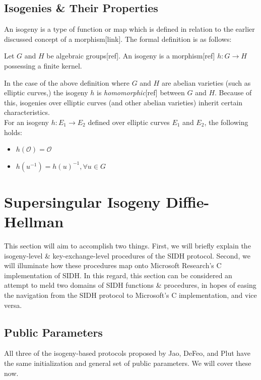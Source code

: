 \subsection{Isogenies \& Their Properties}

An isogeny is a type of function or map which is defined in relation to the earlier discussed concept of a morphism[link]. The formal definition is as follows:\\
\begin{definition}[Isogeny]
\label{defn:isogeny}
Let $G$ and $H$ be algebraic groups[ref]. An isogeny is a morphism[ref] $h: G \rightarrow H$ possessing a finite kernel.
\end{definition}
In the case of the above definition where $G$ and $H$ are abelian varieties (such as elliptic curves,) the isogeny $h$ is \emph{homomorphic}[ref] between $G$ and $H$. Because of this, isogenies over elliptic curves (and other abelian varieties) inherit certain characteristics.\\
For an isogeny $h: E_{1} \rightarrow E_{2}$ defined over elliptic curves $E_1$ and $E_2$, the following holds:
\begin{itemize}
\item $h(\mathcal{O}) = \mathcal{O}$
\item $h(u^{-1}) = h(u)^{-1}, \forall u \in G$
\end{itemize}

\section{Supersingular Isogeny Diffie-Hellman}

This section will aim to accomplish two things. First, we will briefly explain the isogeny-level \& key-exchange-level procedures of the SIDH protocol. Second, we will illuminate how these procedures map onto Microsoft Research's C implementation of SIDH. In this regard, this section can be considered an attempt to meld two domains of SIDH functions \& procedures, in hopes of easing the navigation from the SIDH protocol to Microsoft's C implementation, and vice versa.

\subsection{Public Parameters}

All three of the isogeny-based protocols proposed by Jao, DeFeo, and Plut have the same initialization and general set of public parameters. We will cover these now.

